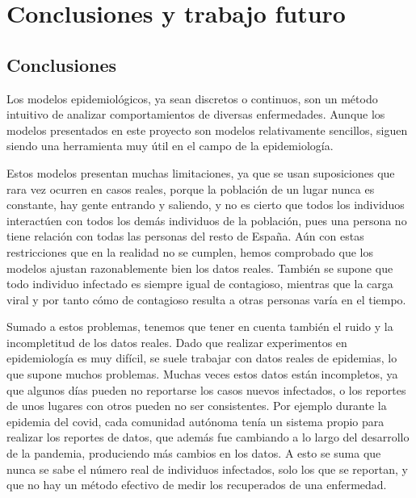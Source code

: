 
\chapter{Conclusiones y trabajo futuro}

\section{Conclusiones}

Los modelos epidemiológicos, ya sean discretos o continuos, son un método intuitivo de analizar comportamientos de diversas enfermedades. Aunque los modelos presentados en este proyecto son modelos relativamente sencillos, siguen siendo una herramienta muy útil en el campo de la epidemiología.

Estos modelos presentan muchas limitaciones, ya que se usan suposiciones que rara vez ocurren en casos reales, porque la población de un lugar nunca es constante, hay gente entrando y saliendo, y no es cierto que todos los individuos interactúen con todos los demás individuos de la población, pues una persona no tiene relación con todas las personas del resto de España. Aún con estas restricciones que en la realidad no se cumplen, hemos comprobado que los modelos ajustan razonablemente bien los datos reales. También se supone que todo individuo infectado es siempre igual de contagioso, mientras que la carga viral y por tanto cómo de contagioso resulta a otras personas varía en el tiempo.

Sumado a estos problemas, tenemos que tener en cuenta también el ruido y la incompletitud de los datos reales. Dado que realizar experimentos en epidemiología es muy difícil, se suele trabajar con datos reales de epidemias, lo que supone muchos problemas. Muchas veces estos datos están incompletos, ya que algunos días pueden no reportarse los casos nuevos infectados, o los reportes de unos lugares con otros pueden no ser consistentes. Por ejemplo durante la epidemia del covid, cada comunidad autónoma tenía un sistema propio para realizar los reportes de datos, que además fue cambiando a lo largo del desarrollo de la pandemia, produciendo más cambios en los datos. A esto se suma que nunca se sabe el número real de individuos infectados, solo los que se reportan, y que no hay un método efectivo de medir los recuperados de una enfermedad.

